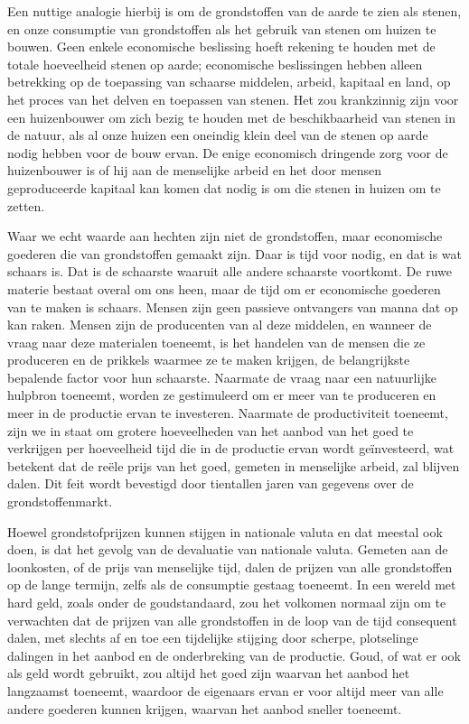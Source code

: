 Een nuttige analogie hierbij is om de grondstoffen van de aarde te zien
als stenen, en onze consumptie van grondstoffen als het gebruik van
stenen om huizen te bouwen. Geen enkele economische beslissing hoeft
rekening te houden met de totale hoeveelheid stenen op aarde;
economische beslissingen hebben alleen betrekking op de toepassing van
schaarse middelen, arbeid, kapitaal en land, op het proces van het
delven en toepassen van stenen. Het zou krankzinnig zijn voor een
huizenbouwer om zich bezig te houden met de beschikbaarheid van stenen
in de natuur, als al onze huizen een oneindig klein deel van de stenen
op aarde nodig hebben voor de bouw ervan. De enige economisch dringende
zorg voor de huizenbouwer is of hij aan de menselijke arbeid en het door
mensen geproduceerde kapitaal kan komen dat nodig is om die stenen in
huizen om te zetten.

Waar we echt waarde aan hechten zijn niet de grondstoffen, maar
economische goederen die van grondstoffen gemaakt zijn. Daar is tijd
voor nodig, en dat is wat schaars is. Dat is de schaarste waaruit alle
andere schaarste voortkomt. De ruwe materie bestaat overal om ons heen,
maar de tijd om er economische goederen van te maken is schaars. Mensen
zijn geen passieve ontvangers van manna dat op kan raken. Mensen zijn de
producenten van al deze middelen, en wanneer de vraag naar deze
materialen toeneemt, is het handelen van de mensen die ze produceren en de
prikkels waarmee ze te maken krijgen, de belangrijkste bepalende factor
voor hun schaarste. Naarmate de vraag naar een natuurlijke hulpbron
toeneemt, worden ze gestimuleerd om er meer van te produceren en meer in
de productie ervan te investeren. Naarmate de productiviteit toeneemt,
zijn we in staat om grotere hoeveelheden van het aanbod van het goed te
verkrijgen per hoeveelheid tijd die in de productie ervan wordt
geïnvesteerd, wat betekent dat de reële prijs van het goed, gemeten in
menselijke arbeid, zal blijven dalen. Dit feit wordt bevestigd door
tientallen jaren van gegevens over de grondstoffenmarkt.

Hoewel grondstofprijzen kunnen stijgen in nationale valuta en dat
meestal ook doen, is dat het gevolg van de devaluatie van nationale
valuta. Gemeten aan de loonkosten, of de prijs van menselijke tijd,
dalen de prijzen van alle grondstoffen op de lange termijn, zelfs als de
consumptie gestaag toeneemt. In een wereld met hard geld, zoals onder de
goudstandaard, zou het volkomen normaal zijn om te verwachten dat de
prijzen van alle grondstoffen in de loop van de tijd consequent dalen,
met slechts af en toe een tijdelijke stijging door scherpe, plotselinge
dalingen in het aanbod en de onderbreking van de productie. Goud, of wat
er ook als geld wordt gebruikt, zou altijd het goed zijn waarvan het
aanbod het langzaamst toeneemt, waardoor de eigenaars ervan er voor
altijd meer van alle andere goederen kunnen krijgen, waarvan het aanbod
sneller toeneemt.

